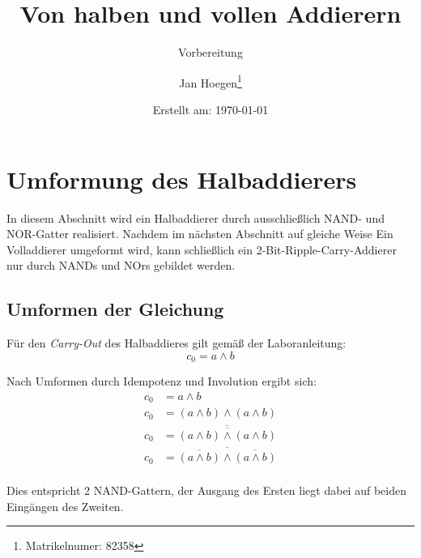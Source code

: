 \documentclass[
    paper=a4,
]{scrartcl}
\title{Von halben und vollen Addierern}
\subtitle{Vorbereitung}
\author{Jan Hoegen\thanks{Matrikelnumer: 82358}}
\date{Erstellt am: \today}
\begin{document}
\maketitle

\tableofcontents

\newpage

\section{Umformung des Halbaddierers}
    In diesem Abschnitt wird ein Halbaddierer durch ausschließlich NAND- und NOR-Gatter realisiert. Nachdem im nächsten Abschnitt auf gleiche Weise Ein Volladdierer umgeformt wird, kann schließlich ein 2-Bit-Ripple-Carry-Addierer nur durch NANDs und NOrs gebildet werden.

    \subsection{Umformen der Gleichung}
        Für den \textit{Carry-Out} des Halbaddieres gilt gemäß der Laboranleitung:
        \[c_0 = a \wedge b\]

        Nach Umformen durch Idempotenz und Involution ergibt sich:
        \begin{align*}
            c_0 &= a \wedge b\\
            c_0 &= ( a \wedge b ) \wedge ( a \wedge b )\\
            c_0 &= \overline{\overline{( a \wedge b ) \wedge ( a \wedge b )}}\\
            c_0 &= \overline{\overline{(a \wedge b)} \wedge \overline{(a \wedge b)}}\\
        \end{align*}

        Dies entspricht 2 NAND-Gattern, der Ausgang des Ersten liegt dabei auf beiden Eingängen des Zweiten.
\end{document}
